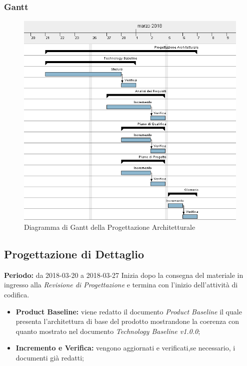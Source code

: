 \subsubsection{Gantt}
\begin{figure}[H]
	\centering 
	\includegraphics[width=1\textwidth]{images/Progettazione-Architetturale.png}
	\caption{Diagramma di Gantt della Progettazione Architetturale}
	\label{graficobello3} 
\end{figure}
\subsection{Progettazione di Dettaglio}
    \textbf{Periodo:} da 2018-03-20 a 2018-03-27\Spazio
    Inizia dopo la consegna del materiale in ingresso alla \emph{Revisione di Progettazione} e termina con l'inizio dell'attività di codifica.
    \begin{itemize}
    	\item \textbf{Product Baseline:} viene redatto il documento \emph{Product Baseline} il quale presenta l'architettura di base del prodotto mostrandone la coerenza con quanto mostrato nel documento \emph{Technology Baseline v1.0.0};
    	\item \textbf{Incremento e Verifica:} vengono aggiornati e verificati,se necessario, i documenti già redatti;
    \end{itemize}
